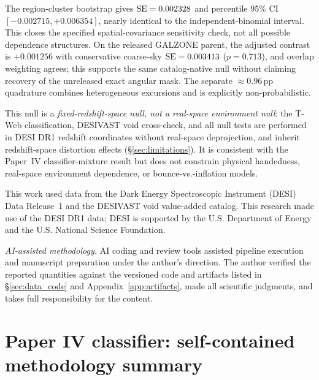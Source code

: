 \documentclass[aps,prd,twocolumn,superscriptaddress,showpacs,preprintnumbers,nofootinbib,longbibliography,floatfix]{revtex4-2}
\begin{document}
The region-cluster bootstrap gives ${\rm SE}=0.002328$ and percentile
$95\%$ CI $[-0.002715,+0.006354]$, nearly identical to the
independent-binomial interval. This closes the specified
spatial-covariance sensitivity check, not all possible dependence
structures. On the released GALZONE parent, the adjusted contrast is
$+0.001256$ with conservative coarse-sky ${\rm SE}=0.003413$
($p=0.713$), and overlap weighting agrees; this supports the same
catalog-native null without claiming recovery of the unreleased exact
angular mask. The separate ${\approx}0.96$\,pp quadrature combines
heterogeneous excursions and is explicitly non-probabilistic.

\begin{center}\end{center}
This null is a \emph{fixed-redshift-space null, not a real-space
environment null}: the T-Web classification, DESIVAST void cross-check,
and all null tests are performed in DESI DR1 redshift coordinates without
real-space deprojection, and inherit redshift-space distortion effects
(\S\ref{sec:limitations}). It is consistent with the Paper~IV
classifier-mixture result but does not constrain physical handedness,
real-space environment dependence, or bounce-vs.-inflation models.

\begin{acknowledgments}
This work used data from the Dark Energy Spectroscopic Instrument (DESI) Data Release~1 and the DESIVAST void value-added catalog. This research made use of the DESI DR1 data; DESI is supported by the U.S. Department of Energy and the U.S. National Science Foundation.

\textit{AI-assisted methodology.} AI coding and review tools assisted
pipeline execution and manuscript preparation under the author's
direction. The author verified the reported quantities against the
versioned code and artifacts listed in \S\ref{sec:data_code} and
Appendix~\ref{app:artifacts}, made all scientific judgments, and takes
full responsibility for the content.
\end{acknowledgments}

\appendix
\section{Paper IV classifier: self-contained methodology summary}\label{app:paper4_methods}
\end{document}
